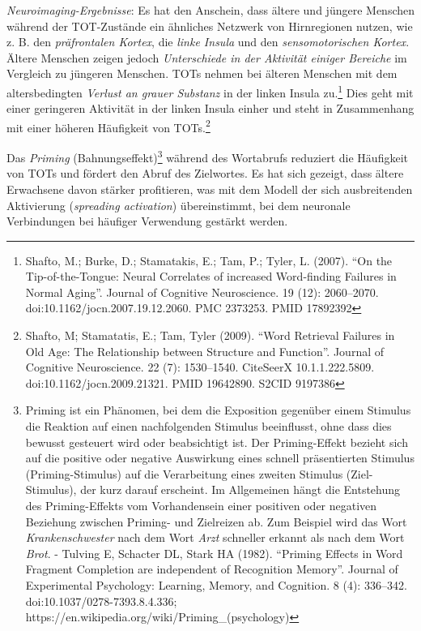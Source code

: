 \documentclass[
  letterpaper,
]{scrbook}
\begin{document}
\emph{Neuroimaging-Ergebnisse}: Es hat den Anschein, dass ältere und
jüngere Menschen während der TOT-Zustände ein ähnliches Netzwerk von
Hirnregionen nutzen, wie z. B. den \emph{präfrontalen Kortex}, die
\emph{linke Insula} und den \emph{sensomotorischen Kortex}. Ältere
Menschen zeigen jedoch \emph{Unterschiede in der Aktivität einiger
Bereiche} im Vergleich zu jüngeren Menschen. TOTs nehmen bei älteren
Menschen mit dem altersbedingten \emph{Verlust an grauer Substanz} in
der linken Insula zu.\footnote{Shafto, M.; Burke, D.; Stamatakis, E.;
  Tam, P.; Tyler, L. (2007). ``On the Tip-of-the-Tongue: Neural
  Correlates of increased Word-finding Failures in Normal Aging''.
  Journal of Cognitive Neuroscience. 19 (12): 2060--2070.
  doi:10.1162/jocn.2007.19.12.2060. PMC 2373253. PMID 17892392} Dies
geht mit einer geringeren Aktivität in der linken Insula einher und
steht in Zusammenhang mit einer höheren Häufigkeit von TOTs.\footnote{Shafto,
  M; Stamatatis, E.; Tam, Tyler (2009). ``Word Retrieval Failures in Old
  Age: The Relationship between Structure and Function''. Journal of
  Cognitive Neuroscience. 22 (7): 1530--1540. CiteSeerX 10.1.1.222.5809.
  doi:10.1162/jocn.2009.21321. PMID 19642890. S2CID 9197386}

Das \emph{Priming} (Bahnungseffekt)\footnote{Priming ist ein Phänomen,
  bei dem die Exposition gegenüber einem Stimulus die Reaktion auf einen
  nachfolgenden Stimulus beeinflusst, ohne dass dies bewusst gesteuert
  wird oder beabsichtigt ist. Der Priming-Effekt bezieht sich auf die
  positive oder negative Auswirkung eines schnell präsentierten Stimulus
  (Priming-Stimulus) auf die Verarbeitung eines zweiten Stimulus
  (Ziel-Stimulus), der kurz darauf erscheint. Im Allgemeinen hängt die
  Entstehung des Priming-Effekts vom Vorhandensein einer positiven oder
  negativen Beziehung zwischen Priming- und Zielreizen ab. Zum Beispiel
  wird das Wort \emph{Krankenschwester} nach dem Wort \emph{Arzt}
  schneller erkannt als nach dem Wort \emph{Brot}. - Tulving E, Schacter
  DL, Stark HA (1982). ``Priming Effects in Word Fragment Completion are
  independent of Recognition Memory''. Journal of Experimental
  Psychology: Learning, Memory, and Cognition. 8 (4): 336--342.
  doi:10.1037/0278-7393.8.4.336;
  https://en.wikipedia.org/wiki/Priming\_(psychology)} während des
Wortabrufs reduziert die Häufigkeit von TOTs und fördert den Abruf des
Zielwortes. Es hat sich gezeigt, dass ältere Erwachsene davon stärker
profitieren, was mit dem Modell der sich ausbreitenden Aktivierung
(\emph{spreading activation}) übereinstimmt, bei dem neuronale
Verbindungen bei häufiger Verwendung gestärkt werden.
\end{document}
